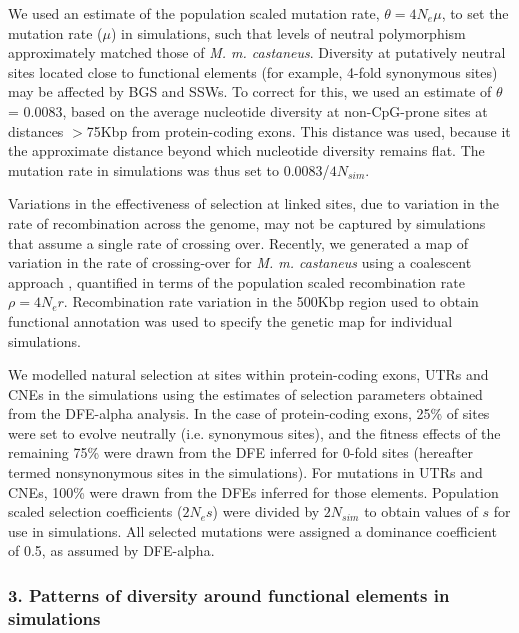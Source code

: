 	We used an estimate of the population scaled mutation rate, $\theta = 4N_e \mu$, to set the mutation rate ($\mu$) in simulations, such that levels of neutral polymorphism approximately matched those of \textit{M. m. castaneus}. Diversity at putatively neutral sites located close to functional elements (for example, 4-fold synonymous sites) may be affected by BGS and SSWs. To correct for this, we used an estimate of $\theta$ = 0.0083, based on the average nucleotide diversity at non-CpG-prone sites at distances $>$75Kbp from protein-coding exons. This distance was used, because it the approximate distance beyond which nucleotide diversity remains flat. The mutation rate in simulations was thus set to 0.0083/$4N_{sim}$. 

	Variations in the effectiveness of selection at linked sites, due to variation in the rate of recombination across the genome, may not be captured by simulations that assume a single rate of crossing over. Recently, we generated a map of variation in the rate of crossing-over for \textit{M. m. castaneus} using a coalescent approach \citep{RN340}, quantified in terms of the population scaled recombination rate $\rho = 4N_er$. Recombination rate variation in the 500Kbp region used to obtain functional annotation was used to specify the genetic map for individual simulations. 

	We modelled natural selection at sites within protein-coding exons, UTRs and CNEs in the simulations using the estimates of selection parameters obtained from the DFE-alpha analysis. In the case of protein-coding exons, 25\% of sites were set to evolve neutrally (i.e. synonymous sites), and the fitness effects of the remaining 75\% were drawn from the DFE inferred for 0-fold sites (hereafter termed nonsynonymous sites in the simulations). For mutations in UTRs and CNEs, 100\% were drawn from the DFEs inferred for those elements. Population scaled selection coefficients ($2N_es$) were divided by $2N_{sim}$ to obtain values of $s$ for use in simulations. All selected mutations were assigned a dominance coefficient of 0.5, as assumed by DFE-alpha.
 
\subsubsection{3. Patterns of diversity around functional elements in simulations}
 
